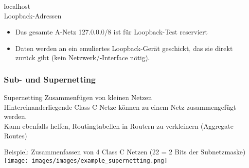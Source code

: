 \begin{definition}{localhost}\\
    Loopback-Adressen
    \begin{itemize}
        \item Das gesamte A-Netz 127.0.0.0/8 ist für Loopback-Test reserviert
        \item Daten werden an ein emuliertes Loopback-Gerät geschickt, das sie direkt zurück gibt (kein Netzwerk/-Interface nötig).
    \end{itemize}
\end{definition}

\subsubsection*{Sub- und Supernetting}

\begin{concept}{Supernetting}
    Zusammenfügen von kleinen Netzen\\
    Hintereinanderliegende Class C Netze können zu einem Netz zusammengefügt werden. \\
    Kann ebenfalls helfen, Routingtabellen in Routern zu verkleinern (Aggregate Routes)
\end{concept}

\begin{example}
    Beispiel: Zusammenfassen von 4 Class C Netzen (22 = 2 Bits der Subnetzmaske)\\
        \texttt{[image: images/images/example\_supernetting.png]}
\end{example}

